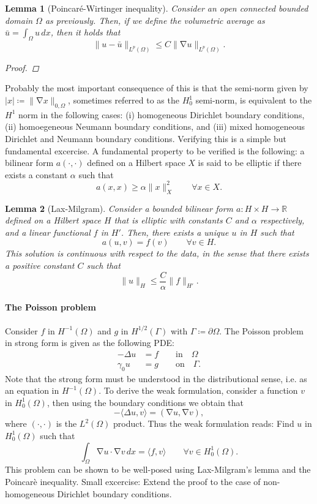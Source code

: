 \documentclass{article}
\DeclareMathOperator{\grad}{\nabla}
\newcommand{\R}{\mathbb{R}}
\newcommand{\tin}{\text{in}}
\newcommand{\ton}{\text{on}}
\newtheorem{lemma}{Lemma}
\begin{document}
\begin{lemma}[Poincaré-Wirtinger inequality]
    Consider an open connected bounded domain $\Omega$ as previously. Then, if we define the volumetric average as $\bar u = \int_\Omega u\,dx$, then it holds that
        $$ \| u - \bar u \|_{L^p(\Omega)} \leq C \| \grad u \|_{L^p(\Omega)}. $$
    \begin{proof}
    \end{proof}
\end{lemma}

Probably the most important consequence of this is that the semi-norm given by $| x | \coloneqq \|\grad x\|_{0,\Omega}$, sometimes referred to as the $H_0^1$ semi-norm, is equivalent to the $H^1$ norm in the following cases: (i) homogeneous Dirichlet boundary conditions, (ii) homoegeneous Neumann boundary conditions, and (iii) mixed homogeneous Dirichlet and Neumann boundary conditions. Verifying this is a simple but fundamental excercise. A fundamental property to be verified is the following: a bilinear form $a(\cdot, \cdot)$ defined on a Hilbert space $X$ is said to be elliptic if there exists a constant $\alpha$ such that
        $$ a(x, x) \geq \alpha \| x \|^2_X \qquad \forall x\in X. $$

\begin{lemma}[Lax-Milgram] Consider a bounded bilinear form $a: H\times H\to \R$ defined on a Hilbert space $H$ that is elliptic with constants $C$ and $\alpha$ respectively, and a linear functional $f$ in $H'$. Then, there exists a unique $u$ in $H$ such that 
    $$ a(u, v) = f(v) \qquad \forall v \in H. $$
This solution is continuous with respect to the data, in the sense that there exists a positive constant $C$ such that 
    $$ \| u\|_H \leq \frac C \alpha \| f \|_{H'} .$$
\end{lemma}



\paragraph{The Poisson problem} Consider $f$ in $H^{-1}(\Omega)$ and $g$ in $H^{1/2}(\Gamma)$ with $\Gamma\coloneqq \partial\Omega$. The Poisson problem in strong form is given as the following PDE: 
    \begin{align*}
        -\Delta u  &= f \qquad \tin\quad\Omega\\
        \gamma_0 u &= g \qquad \ton\quad \Gamma.
    \end{align*}
Note that the strong form must be understood in the distributional sense, i.e. as an equation in $H^{-1}(\Omega)$. To derive the weak formulation, consider a function $v$ in $H_0^1(\Omega)$, then using the boundary conditions we obtain that 
    $$ -\langle \Delta u,v\rangle = (\grad u, \grad v),$$
where $(\cdot, \cdot)$ is the $L^2(\Omega)$ product. Thus the weak formulation reads: Find $u$ in $H_0^1(\Omega)$ such that 
    $$ \int_\Omega \grad u\cdot \grad v\,dx = \langle f, v\rangle \qquad \forall v\in H_0^1(\Omega).$$
This problem can be shown to be well-posed using Lax-Milgram's lemma and the Poincarè inequality. Small excercise: Extend the proof to the case of non-homogeneous Dirichlet boundary conditions.
\end{document}
